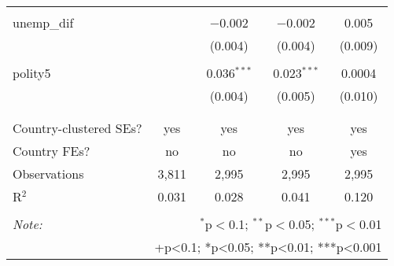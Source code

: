 \documentclass[11pt,]{article}
\begin{document}
\begin{table}[!htbp]
\begin{tabular}{@{\extracolsep{5pt}}lcccc}
  & & & & \\ 
 unemp\_dif &  & $-$0.002 & $-$0.002 & 0.005 \\ 
  &  & (0.004) & (0.004) & (0.009) \\ 
  & & & & \\ 
 polity5 &  & 0.036$^{***}$ & 0.023$^{***}$ & 0.0004 \\ 
  &  & (0.004) & (0.005) & (0.010) \\ 
  & & & & \\ 
\hline \\[-1.8ex] 
Country-clustered SEs? & yes & yes & yes & yes \\ 
Country FEs? & no & no & no & yes \\ 
Observations & 3,811 & 2,995 & 2,995 & 2,995 \\ 
R$^{2}$ & 0.031 & 0.028 & 0.041 & 0.120 \\ 
\hline 
\hline \\[-1.8ex] 
\textit{Note:}  & \multicolumn{4}{r}{$^{*}$p$<$0.1; $^{**}$p$<$0.05; $^{***}$p$<$0.01} \\ 
 & \multicolumn{4}{r}{+p<0.1; *p<0.05; **p<0.01; ***p<0.001} \\ 
\end{tabular} 
\end{table}
\end{document}
